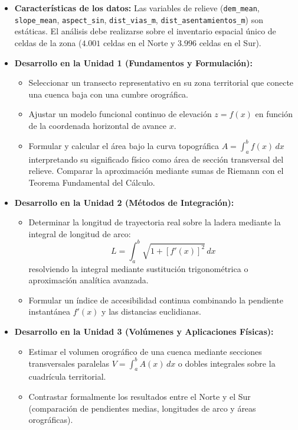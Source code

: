 \documentclass[11pt,a4paper]{article}
\begin{document}
\begin{itemize}[leftmargin=*,itemsep=1.5pt]
  \item \textbf{Características de los datos:} Las variables de relieve (\texttt{dem\_mean}, \texttt{slope\_mean}, \texttt{aspect\_sin}, \texttt{dist\_vias\_m}, \texttt{dist\_asentamientos\_m}) son estáticas. El análisis debe realizarse sobre el inventario espacial único de celdas de la zona ($4.001$ celdas en el Norte y $3.996$ celdas en el Sur).
  \item \textbf{Desarrollo en la Unidad 1 (Fundamentos y Formulación):}
  \begin{itemize}
    \item Seleccionar un transecto representativo en su zona territorial que conecte una cuenca baja con una cumbre orográfica.
    \item Ajustar un modelo funcional continuo de elevación $z = f(x)$ en función de la coordenada horizontal de avance $x$.
    \item Formular y calcular el área bajo la curva topográfica $A = \int_{a}^{b} f(x)\,dx$ interpretando su significado físico como área de sección transversal del relieve. Comparar la aproximación mediante sumas de Riemann con el Teorema Fundamental del Cálculo.
  \end{itemize}
  \item \textbf{Desarrollo en la Unidad 2 (Métodos de Integración):}
  \begin{itemize}
    \item Determinar la longitud de trayectoria real sobre la ladera mediante la integral de longitud de arco:
    \begin{equation*}
      L = \int_{a}^{b} \sqrt{1 + [f'(x)]^2}\,dx
    \end{equation*}
    resolviendo la integral mediante sustitución trigonométrica o aproximación analítica avanzada.
    \item Formular un índice de accesibilidad continua combinando la pendiente instantánea $f'(x)$ y las distancias euclidianas.
  \end{itemize}
  \item \textbf{Desarrollo en la Unidad 3 (Volúmenes y Aplicaciones Físicas):}
  \begin{itemize}
    \item Estimar el volumen orográfico de una cuenca mediante secciones transversales paralelas $V = \int_{a}^{b} A(x)\,dx$ o dobles integrales sobre la cuadrícula territorial.
    \item Contrastar formalmente los resultados entre el Norte y el Sur (comparación de pendientes medias, longitudes de arco y áreas orográficas).
  \end{itemize}
\end{itemize}
\end{document}
